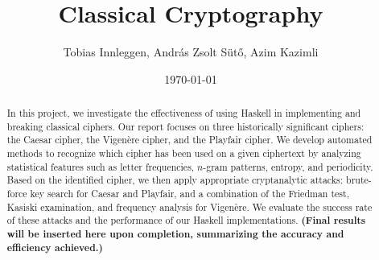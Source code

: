 \documentclass[12pt,a4paper]{article}
\title{Classical Cryptography}
\author{Tobias Innleggen, András Zsolt Sütő, Azim Kazimli}
\date{\today}
\begin{document}
\maketitle


\begin{abstract}
    In this project, we investigate the effectiveness of using Haskell
     in implementing and breaking classical ciphers. Our report focuses on three historically significant ciphers: the Caesar cipher, 
    the Vigen\`ere cipher, and the Playfair cipher. We develop automated methods to recognize which cipher has been used on a given ciphertext by analyzing statistical 
    features such as letter frequencies, $n$-gram patterns, entropy, and periodicity. Based on the identified cipher, we then apply appropriate cryptanalytic attacks: 
    brute-force key search for Caesar and Playfair, and a combination of the Friedman test, Kasiski examination, and frequency analysis for Vigen\`ere. We evaluate the
     success rate of these attacks and the performance of our Haskell implementations. 
      \textbf{(Final results will be inserted here upon completion, summarizing the accuracy and efficiency achieved.)}
    \end{abstract}
\vfill

\tableofcontents

\clearpage






















\end{document}
